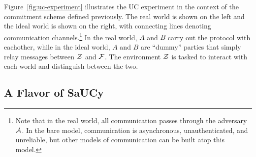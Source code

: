  Figure~\ref{fig:uc-experiment}
illustrates the UC experiment in the context of the commitment scheme defined
previously. The real world is shown on the left and the ideal world is shown on
the right, with connecting lines denoting communication channels.\footnote{Note
  that in the real world, all communication passes through the adversary
  $\mathcal{{A}}$. In the bare model, communication is asynchronous, unauthenticated,
  and unreliable, but other models of communication can be built atop this
  model.} In the real world, $A$ and $B$ carry out the protocol with eachother,
while in the ideal world, $A$ and $B$ are ``dummy'' parties that simply relay
messages between $\mathcal{{Z}}$ and $\mathcal{{F}}$. The environment $\mathcal{{Z}}$ is tasked to
interact with each world and distinguish between the two.

\subsection{A Flavor of SaUCy}
\label{subsec:sauce-flavored}


